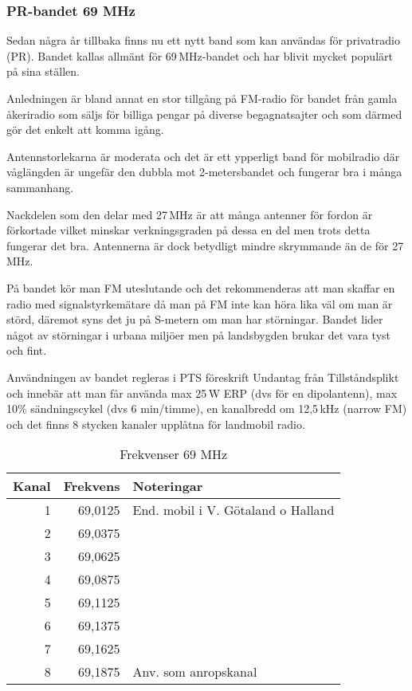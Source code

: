 \subsubsection{PR-bandet 69 MHz}

Sedan några år tillbaka finns nu ett nytt band som kan användas för
privatradio (PR). Bandet kallas allmänt för 69\,MHz-bandet och har
blivit mycket populärt på sina ställen.

Anledningen är bland annat en stor tillgång på FM-radio för bandet
från gamla åkeriradio som säljs för billiga pengar på diverse
begagnatsajter och som därmed gör det enkelt att komma igång.

Antennstorlekarna är moderata och det är ett ypperligt band för mobilradio där våglängden är ungefär den dubbla mot 2-metersbandet och fungerar bra i många sammanhang.

Nackdelen som den delar med 27\,MHz är att många antenner för fordon är förkortade vilket minskar verkningsgraden på dessa en del men trots detta fungerar det bra. Antennerna är dock betydligt mindre skrymmande än de för 27\,MHz.

På bandet kör man FM uteslutande och det rekommenderas att man skaffar en radio med signalstyrkemätare då man på FM inte kan höra lika väl om man är störd, däremot syns det ju på S-metern om man har störningar. Bandet lider något av störningar i urbana miljöer men på landsbygden brukar det vara tyst och fint.

Användningen av bandet regleras i PTS föreskrift Undantag från Tillståndsplikt och innebär att man får använda max 25\,W ERP (dvs för en dipolantenn), max 10\% sändningscykel (dvs 6 min/timme), en kanalbredd om 12,5\,kHz (narrow FM) och det finns 8 stycken kanaler upplåtna för landmobil radio.

\begin{table}[h]
  \centering
\begin{tabular}{rrl}
  Kanal & Frekvens & Noteringar                         \\ \hline
  1     & 69,0125  & End. mobil i V. Götaland o Halland \\
  2     & 69,0375  &                                    \\
  3     & 69,0625  &                                    \\
  4     & 69,0875  &                                    \\
  5     & 69,1125  &                                    \\
  6     & 69,1375  &                                    \\
  7     & 69,1625  &                                    \\
  8     & 69,1875  & Anv. som anropskanal               \\
\end{tabular}
\caption{Frekvenser 69 MHz}
\end{table}

